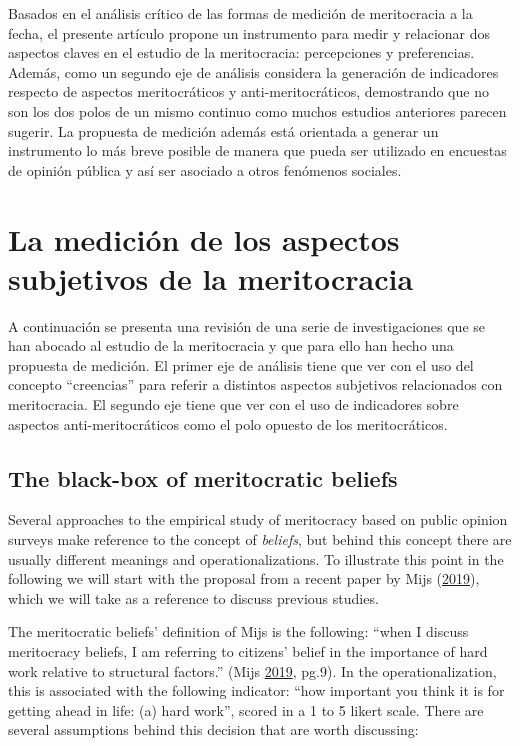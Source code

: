 \documentclass[
]{article}
\begin{document}
Basados en el análisis crítico de las formas de medición de meritocracia
a la fecha, el presente artículo propone un instrumento para medir y
relacionar dos aspectos claves en el estudio de la meritocracia:
percepciones y preferencias. Además, como un segundo eje de análisis
considera la generación de indicadores respecto de aspectos
meritocráticos y anti-meritocráticos, demostrando que no son los dos
polos de un mismo continuo como muchos estudios anteriores parecen
sugerir. La propuesta de medición además está orientada a generar un
instrumento lo más breve posible de manera que pueda ser utilizado en
encuestas de opinión pública y así ser asociado a otros fenómenos
sociales.

\hypertarget{la-mediciuxf3n-de-los-aspectos-subjetivos-de-la-meritocracia}{%
\section{La medición de los aspectos subjetivos de la
meritocracia}\label{la-mediciuxf3n-de-los-aspectos-subjetivos-de-la-meritocracia}}

A continuación se presenta una revisión de una serie de investigaciones
que se han abocado al estudio de la meritocracia y que para ello han
hecho una propuesta de medición. El primer eje de análisis tiene que ver
con el uso del concepto ``creencias'' para referir a distintos aspectos
subjetivos relacionados con meritocracia. El segundo eje tiene que ver
con el uso de indicadores sobre aspectos anti-meritocráticos como el
polo opuesto de los meritocráticos.

\hypertarget{the-black-box-of-meritocratic-beliefs}{%
\subsection{The black-box of meritocratic
beliefs}\label{the-black-box-of-meritocratic-beliefs}}

Several approaches to the empirical study of meritocracy based on public
opinion surveys make reference to the concept of \emph{beliefs}, but
behind this concept there are usually different meanings and
operationalizations. To illustrate this point in the following we will
start with the proposal from a recent paper by Mijs
(\protect\hyperlink{ref-mijs_paradox_2019}{2019}), which we will take as
a reference to discuss previous studies.

The meritocratic beliefs' definition of Mijs is the following: ``when I
discuss meritocracy beliefs, I am referring to citizens' belief in the
importance of hard work relative to structural factors.'' (Mijs
\protect\hyperlink{ref-mijs_paradox_2019}{2019}, pg.9). In the
operationalization, this is associated with the following indicator:
``how important you think it is for getting ahead in life: (a) hard
work'', scored in a 1 to 5 likert scale. There are several assumptions
behind this decision that are worth discussing:
\end{document}
